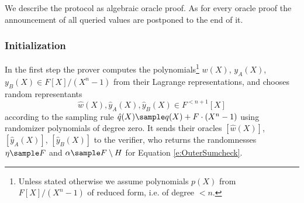 \documentclass[10pt,article,oneside]{memoir}
\theoremstyle{definition}
\theoremstyle{remark}
\begin{document}

\medskip
We describe the protocol as algebraic oracle proof.
As for every oracle proof the announcement of all queried values are postponed to the end of it.

\subsubsection{Initialization}
In the first step the prover computes the polynomials\footnote{%
Unless stated otherwise we assume polynomials $p(X)$ from $F[X]/(X^n-1)$ of reduced form, i.e. of degree $<n$.
} 
$w(X)$,  $y_A(X)$, $y_B(X)\in F[X]/(X^n - 1)$ from their Lagrange representations, and chooses random representants 
\[
\hat w(X), \hat y_A(X), \hat y_B(X) \in F^{<n+1}[X] 
\]
according to the sampling rule $\hat q(X) \sample q(X) + F \cdot (X^n-1)$ using randomizer polynomials of degree zero.
It sends their oracles $[\hat w(X)]$, $[\hat y_A(X)]$, $[\hat y_B(X)]$ to the verifier,  who returns the randomnesses $\eta\sample F$ and $\alpha\sample F\setminus H$ for Equation \eqref{e:OuterSumcheck}.
\end{document}
